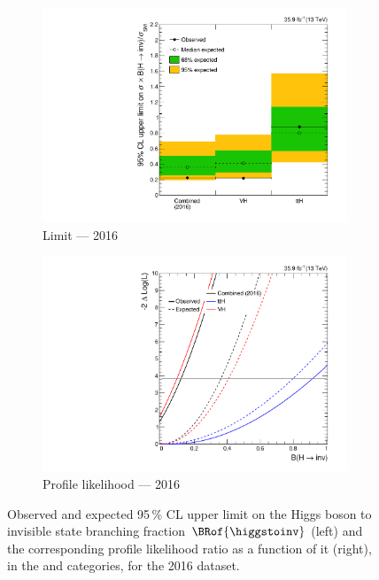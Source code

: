 \begin{figure}[htbp]
    \centering
    \begin{subfigure}[t]{0.45\textwidth}  %
        \includegraphics[width=\textwidth]{chapters/higgstoinv/figures/limits/per_year/limit_2016_comb.pdf}
        \caption{Limit --- 2016}
    \end{subfigure}
    \hspace{0.05\textwidth}
    \begin{subfigure}[t]{0.45\textwidth}
        \includegraphics[width=\textwidth]{chapters/higgstoinv/figures/likelihood_scan/profile_likelihood_scan_2016.pdf}
        \caption{Profile likelihood --- 2016}
    \end{subfigure}
    \caption[Observed and expected 95\,\% CL upper limit on the Higgs boson to invisible state branching fraction $\BRof{\higgstoinv}$ and the corresponding profile likelihood ratio as a function of it, in the \ttH and \VH categories, for the 2016 dataset]{Observed and expected 95\,\% CL upper limit on the Higgs boson to invisible state branching fraction $\BRof{\higgstoinv}$ (left) and the corresponding profile likelihood ratio as a function of it (right), in the \ttH and \VH categories, for the 2016 dataset.}
    \label{fig:htoinv_limit_likelihood_2016}
\end{figure}

